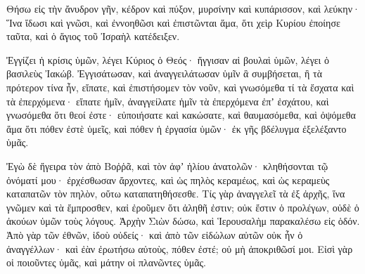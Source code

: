 {Θήσω εἰς τὴν ἄνυδρον γῆν, κέδρον καὶ πύξον, μυρσίνην καὶ κυπάρισσον, καὶ λεύκην·
Ἵνα ἴδωσι καὶ γνῶσι, καὶ ἐννοηθῶσι καὶ ἐπιστῶνται ἅμα, ὅτι χεὶρ Κυρίου ἐποίησε ταῦτα, καὶ ὁ ἅγιος τοῦ Ἰσραὴλ κατέδειξεν.
\par }{\PP {}Ἐγγίζει ἡ κρίσις ὑμῶν, λέγει Κύριος ὁ Θεός· ἤγγισαν αἱ βουλαὶ ὑμῶν, λέγει ὁ βασιλεὺς Ἰακώβ.
Ἐγγισάτωσαν, καὶ ἀναγγειλάτωσαν ὑμῖν ἃ συμβήσεται, ἢ τὰ πρότερον τίνα ἦν, εἴπατε, καὶ ἐπιστήσομεν τὸν νοῦν, καὶ γνωσόμεθα τί τὰ ἔσχατα καὶ τὰ ἐπερχόμενα·
εἴπατε ἡμῖν, ἀναγγείλατε ἡμῖν τὰ ἐπερχόμενα ἐπʼ ἐσχάτου, καὶ γνωσόμεθα ὅτι θεοί ἐστε· εὐποιήσατε καὶ κακώσατε, καὶ θαυμασόμεθα, καὶ ὀψόμεθα ἅμα
ὅτι πόθεν ἐστὲ ὑμεῖς, καὶ πόθεν ἡ ἐργασία ὑμῶν· ἐκ γῆς βδέλυγμα ἐξελέξαντο ὑμᾶς.
\par }{\PP {}Ἐγὼ δὲ ἤγειρα τὸν ἀπὸ Βοῤῥᾶ, καὶ τὸν ἀφʼ ἡλίου ἀνατολῶν· κληθήσονται τῷ ὀνόματί μου· ἐρχέσθωσαν ἄρχοντες, καὶ ὡς πηλὸς κεραμέως, καὶ ὡς κεραμεὺς καταπατῶν τὸν πηλὸν, οὕτω καταπατηθήσεσθε.
Τίς γὰρ ἀναγγελεῖ τὰ ἐξ ἀρχῆς, ἵνα γνῶμεν καὶ τὰ ἔμπροσθεν, καἰ ἐροῦμεν ὅτι ἀληθῆ ἐστιν; οὐκ ἔστιν ὁ προλέγων, οὐδὲ ὁ ἀκούων ὑμῶν τοὺς λόγους.
Ἀρχὴν Σιὼν δώσω, καὶ Ἱερουσαλὴμ παρακαλέσω εἰς ὁδόν.
Ἀπὸ γὰρ τῶν ἐθνῶν, ἰδοὺ οὐδείς· καὶ ἀπὸ τῶν εἰδώλων αὐτῶν οὐκ ἦν ὁ ἀναγγέλλων· καὶ ἐὰν ἐρωτήσω αὐτοὺς, πόθεν ἐστέ; οὐ μὴ ἀποκριθῶσί μοι.
Εἰσὶ γὰρ οἱ ποιοῦντες ὑμᾶς, καὶ μάτην οἱ πλανῶντες ὑμᾶς.

}
